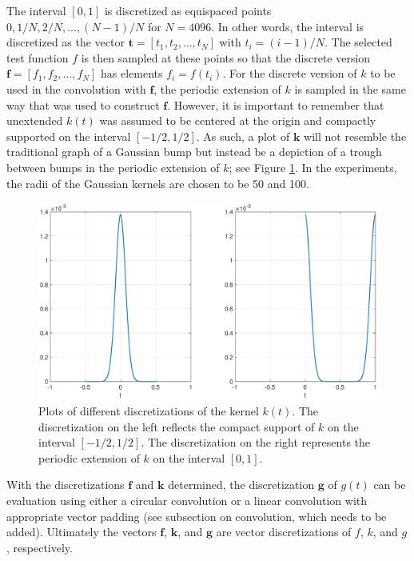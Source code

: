 \documentclass[12pt]{article}
\newcommand{\gcon}{g}
\newcommand{\kcon}{k}
\newcommand{\fcon}{f}
\newcommand{\gdis}{\mathbf{g}}
\newcommand{\kdis}{\mathbf{k}}
\newcommand{\fdis}{\mathbf{f}}
\newcommand{\tdis}{\mathbf{t}}
\begin{document}
The interval $[0,1]$ is discretized as equispaced points $0, 1/N, 2/N, \ldots, (N-1)/N$ for $N = 4096$. In other words, the interval is discretized as the vector $\tdis = [t_1,t_2,\ldots,t_N]$ with $t_i = (i-1)/N$. The selected test function $\fcon$ is then sampled at these points so that the discrete version $\fdis = [\fcon_1,\fcon_2,\ldots,\fcon_N]$ has elements $\fcon_i = \fcon(t_i)$. For the discrete version of $\kcon$ to be used in the convolution with $\fdis$, the periodic extension of $\kcon$ is sampled in the same way that was used to construct $\fdis$. However, it is important to remember that unextended $\kcon(t)$ was assumed to be centered at the origin and compactly supported on the interval $[-1/2,1/2]$. As such, a plot of $\kdis$ will not resemble the traditional graph of a Gaussian bump but instead be a depiction of a trough between bumps in the periodic extension of $\kcon$; see Figure \ref{RegAndTroughGaussian}. In the experiments, the radii of the Gaussian kernels are chosen to be 50 and 100.  \par

\begin{figure}
	\centerline{\includegraphics[scale = 0.45]{Figures/RegAndTroughGaussian.eps}}
\caption{Plots of different discretizations of the kernel $\kcon(t)$. The discretization on the left reflects the compact support of $\kcon$ on the interval $[-1/2,1/2]$. The discretization on the right represents the periodic extension of $\kcon$ on the interval $[0,1]$.}
\label{RegAndTroughGaussian}
\end{figure}

With the discretizations $\fdis$ and $\kdis$ determined, the discretization $\gdis$ of $\gcon(t)$ can be evaluation using either a circular convolution or a linear convolution with appropriate vector padding (see subsection on convolution, which needs to be added). Ultimately the vectors $\fdis$, $\kdis$, and $\gdis$ are vector discretizations of $\fcon$, $\kcon$, and $\gcon$, respectively.
\end{document}
